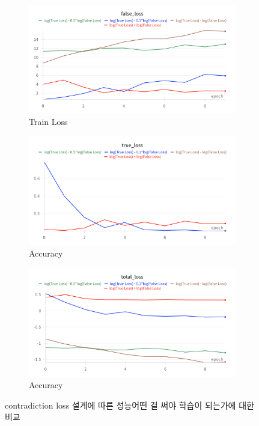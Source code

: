 \documentclass[a4paper,fleqn]{cas-sc}
\begin{document}
\begin{figure}[htbp]
    \centering

    \begin{subfigure}[b]{0.48\textwidth}
        \centering
        \includegraphics[width=\textwidth]{3_false_loss.png}
        \caption{Train Loss}
        \label{fig:neutral_only}
    \end{subfigure}
    \hspace{0.02\textwidth}
    \begin{subfigure}[b]{0.48\textwidth}
        \centering
        \includegraphics[width=\textwidth]{3_true_loss.png}
        \caption{Accuracy}
        \label{fig:both_relations}
    \end{subfigure}
    \hspace{0.02\textwidth}
    \begin{subfigure}[b]{0.48\textwidth}
        \centering
        \includegraphics[width=\textwidth]{3_total_loss.png}
        \caption{Accuracy}
        \label{fig:both_relations}
    \end{subfigure}
    \caption{contradiction loss 설계에 따른 성능어떤 걸 써야 학습이 되는가에 대한 비교}
    \label{fig:relation_ablation}
\end{figure}
\end{document}
